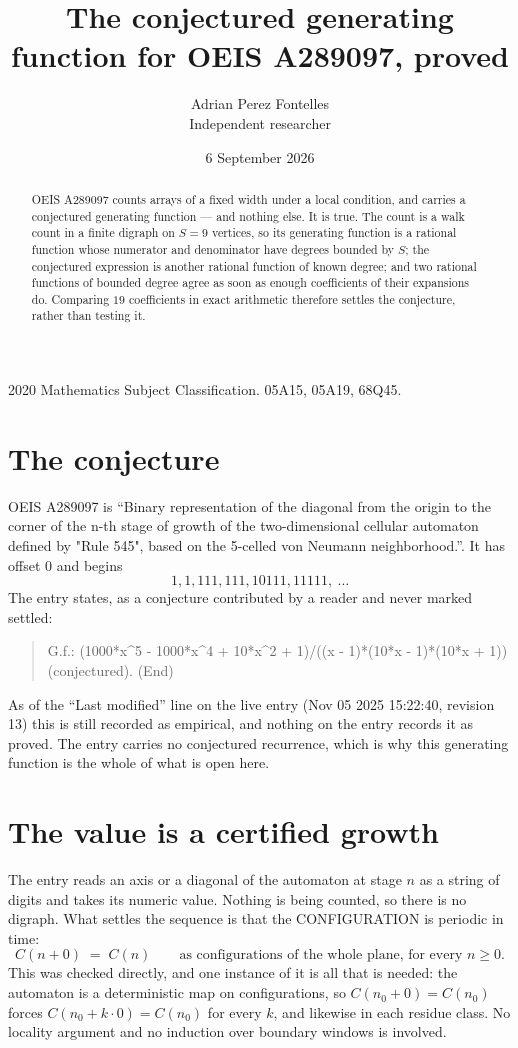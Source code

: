 \documentclass[11pt,a4paper]{article}
\title{The conjectured generating function for OEIS A289097, proved}
\author{Adrian Perez Fontelles\\ \small Independent researcher}
\date{6 September 2026}
\theoremstyle{plain}
\theoremstyle{definition}
\begin{document}
\maketitle

\begin{abstract}
OEIS A289097 counts arrays of a fixed width under a local condition, and carries a conjectured
generating function --- and nothing else. It is true. The count is a walk count in a finite
digraph on $S=9$ vertices, so its generating function is a rational function whose numerator
and denominator have degrees bounded by $S$; the conjectured expression is another rational
function of known degree; and two rational functions of bounded degree agree as soon as enough
coefficients of their expansions do. Comparing $19$ coefficients in exact arithmetic
therefore settles the conjecture, rather than testing it.
\end{abstract}

\noindent\small 2020 Mathematics Subject Classification. 05A15, 05A19, 68Q45.\normalsize

\section{The conjecture}

OEIS A289097 is ``Binary representation of the diagonal from the origin to the corner of the n-th stage of growth of the two-dimensional cellular automaton defined by "Rule 545", based on the 5-celled von Neumann neighborhood.''. It has offset $0$ and begins
\[
1, 1, 111, 111, 10111, 11111,\ \dots
\]
The entry states, as a conjecture contributed by a reader and never marked settled:
\begin{quote}
G.f.: (1000*x\^{}5 - 1000*x\^{}4 + 10*x\^{}2 + 1)/((x - 1)*(10*x - 1)*(10*x + 1)) (conjectured). (End)
\end{quote}
As of the ``Last modified'' line on the live entry (Nov 05 2025 15:22:40, revision 13) this is still
recorded as empirical, and nothing on the entry records it as proved. The entry carries no
conjectured recurrence, which is why this generating function is the whole of what is open
here.


\section{The value is a certified growth}

The entry reads an axis or a diagonal of the automaton at stage $n$ as a string of digits and
takes its numeric value. Nothing is being counted, so there is no digraph. What settles the
sequence is that the CONFIGURATION is periodic in time:
\[
C(n+0)\;=\;C(n)\qquad\text{as configurations of the whole plane, for every } n\ge 0.
\]
This was checked directly, and one instance of it is all that is needed: the automaton is a
deterministic map on configurations, so $C(n_0+0)=C(n_0)$ forces $C(n_0+k\cdot0)=C(n_0)$ for
every $k$, and likewise in each residue class. No locality argument and no induction over
boundary windows is involved.
\end{document}

